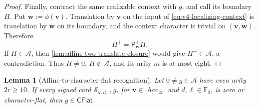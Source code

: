 \documentclass[11pt,letterpaper,onecolumn]{article}
\theoremstyle{plain}
\newtheorem{lemma}[lemma]{Lemma}
\theoremstyle{definition}
\theoremstyle{remark}
\newcommand{\Ftwo}{\mathbb F_2}
\newcommand{\cA}{\mathscr A}
\begin{document}
\begin{proof}
Finally, contract the same realizable context with \(g\), and call its boundary
\(H\).  Put \({\mathbf{w}}:=\phi({\mathbf{v}})\).  Translation by \({\mathbf{v}}\) on the input of
\cref{eq:v4-localizing-context} is translation by \({\mathbf{w}}\) on its boundary,
and the context character is trivial on \(({\mathbf{v}},{\mathbf{w}})\).  Therefore
\[
 H^+=\mathsf P_{\mathbf{w}}^+H.
\]
If \(H\in\cA\), then \cref{lem:affine-two-translate-closure} would give
\(H^+\in\cA\), a contradiction.  Thus \(H\ne0\), \(H\notin\cA\), and its
arity \(m\) is at most eight.
\end{proof}

\begin{lemma}[Affine-to-character-flat recognition]
\label{lem:v4-affine-character-radon}
Let \(0\ne g\in\cA\) have even arity \(2r\ge10\).  If every signed card
\(\mathcal S_{{\mathbf{v}},d,\ell}g\), for
\({\mathbf{v}}\in\operatorname{Acc}_{2r}\) and \(d,\ell\in\Ftwo\), is zero or
character-flat, then \(g\in\mathsf{CFlat}\).
\end{lemma}
\end{document}
